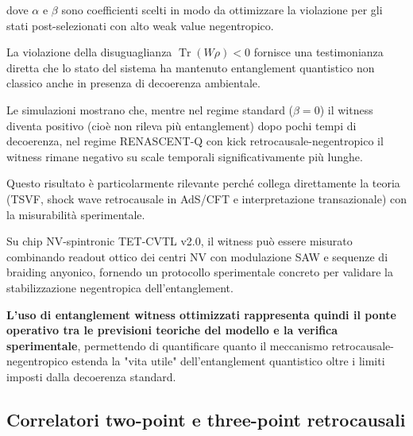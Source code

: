 \documentclass[11pt,a4paper]{article}
\theoremstyle{plain}
\theoremstyle{definition}
\begin{document}
\vspace{0.2cm}
dove $\alpha$ e $\beta$ sono coefficienti scelti in modo da ottimizzare la violazione per gli stati post-selezionati con alto weak value negentropico. 

La violazione della disuguaglianza $\operatorname{Tr}(W \rho) < 0$ fornisce una testimonianza diretta che lo stato del sistema ha mantenuto entanglement quantistico non classico anche in presenza di decoerenza ambientale. 


\vspace{0.3cm}


Le simulazioni mostrano che, mentre nel regime standard ($\beta=0$) il witness diventa positivo (cioè non rileva più entanglement) dopo pochi tempi di decoerenza, nel regime RENASCENT-Q con kick retrocausale-negentropico il witness rimane negativo su scale temporali significativamente più lunghe.

\vspace{0.3cm}

Questo risultato è particolarmente rilevante perché collega direttamente la teoria (TSVF, shock wave retrocausale in AdS/CFT e interpretazione transazionale) con la misurabilità sperimentale. 

\vspace{0.2cm}


Su chip NV-spintronic TET-CVTL v2.0, il witness può essere misurato combinando readout ottico dei centri NV con modulazione SAW e sequenze di braiding anyonico, fornendo un protocollo sperimentale concreto per validare la stabilizzazione negentropica dell'entanglement.

\vspace{0.3cm}

\textbf{L'uso di entanglement witness ottimizzati rappresenta quindi il ponte operativo tra le previsioni teoriche del modello e la verifica sperimentale}, permettendo di quantificare quanto il meccanismo retrocausale-negentropico estenda la "vita utile" dell'entanglement quantistico oltre i limiti imposti dalla decoerenza standard.



\vspace{0.5cm}


\subsection{Correlatori two-point e three-point retrocausali}

\vspace{0.2cm}
\end{document}
